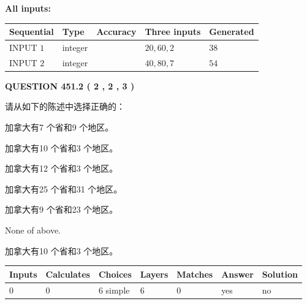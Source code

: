 \documentclass{ctexart}
\begin{document}
   
   
   
\noindent\vspace{0.1in}\hspace{-0.08in} {\textbf{\Large{All inputs: }}}
   
   
  
  
\noindent\begin{tabular}{|l|l|l|l|l|}
\hline
 Sequential & Type & Accuracy & Three inputs & Generated \\ 
\hline
 
 
  INPUT $  1 $ & integer &  & $
 20
 , 
 60
 , 
 2
 $ & $ 38 $ 
 \\  \hline  
 
 
  INPUT $  2 $ & integer &  & $
 40
 , 
 80
 , 
 7
 $ & $ 54 $ 
 \\  \hline  
 \end{tabular}
   
   
  
\vspace{0.2in}
  
{\textbf{\Large{QUESTION
451.2 
 ( 2 , 2 , 3 )
}}}
  
  
请从如下的陈述中选择正确的：
 
 
加拿大有7 个省和9 个地区。
 
 
加拿大有10 个省和3 个地区。
 
 
加拿大有12 个省和3 个地区。
 
 
加拿大有25 个省和31 个地区。
 
 
加拿大有9 个省和23 个地区。
 
 
 None of above.
 
 
\noindent{}
 
 
加拿大有10 个省和3 个地区。
 
 
\noindent{}
 
 
   
   
   
   
\noindent\begin{tabular}{|l|l|l|l|l|l|l|}
 \hline
Inputs & Calculates & Choices & Layers & Matches & Answer & Solution \\ \hline
 0  & 
 0  & 
 6
  simple  
  & 
 6  & 
 0  & 
  yes & 
  no 
  \\ \hline
 \end{tabular}
   
\end{document}
